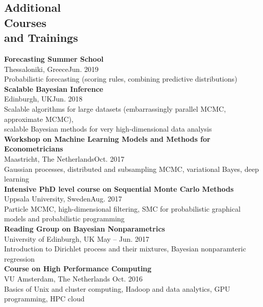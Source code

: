 \documentclass[margin,line]{resume}
\begin{document}
\begin{resume}
\section{\mysidestyle Additional\\ Courses \\and Trainings} 
	\textbf{Forecasting Summer School}\\
        Thessaloniki, Greece\hfill Jun. 2019\\
        Probabilistic forecasting (scoring rules, combining predictive distributions)\vspace{1.5mm} \\	
	\textbf{Scalable Bayesian Inference}\\
        Edinburgh, UK\hfill Jun. 2018\\
        Scalable algorithms for large datasets (embarrassingly parallel MCMC, approximate MCMC),\\ scalable Bayesian methods for very high-dimensional data analysis\vspace{1.5mm} \\	
	\textbf{Workshop on Machine Learning Models and Methods for Econometricians}\\
        Maastricht, The Netherlands\hfill Oct. 2017\\
        Gaussian processes, distributed and subsampling MCMC, variational Bayes,  deep learning\vspace{1.5mm} \\	
	\textbf{Intensive PhD level course on Sequential Monte Carlo Methods}\\
        Uppsala University, Sweden\hfill Aug. 2017\\
        Particle MCMC, high-dimensional filtering, SMC for probabilistic graphical models and probabilistic programming\vspace{1.5mm} \\   
	\textbf{Reading Group on Bayesian Nonparametrics}\\
        University of Edinburgh, UK \hfill May -- Jun. 2017\\
        Introduction to Dirichlet process and their mixtures, Bayesian nonparamteric regression\vspace{1.5mm} \\
	\textbf{Course on High Performance Computing}\\
        VU Amsterdam, The Netherlands \hfill Oct. 2016\\
        Basics of Unix and cluster computing,  Hadoop and data analytics, GPU programming, HPC cloud\vspace{1.5mm} \\

\end{resume}
\end{document}
